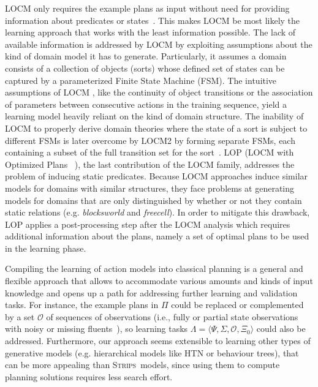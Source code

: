 \documentclass[3p,times]{elsarticle}
\newcommand{\strips}{\textsc{Strips}}     %
\newcommand{\tup}[1]{{\langle #1 \rangle}}
\begin{document}
{\sf LOCM} only requires the example plans as input without need for providing information about predicates or states~\cite{cresswell2013acquiring}. This makes {\sf LOCM} be most likely the learning approach that works with the least information possible. The lack of available information is addressed by LOCM by exploiting assumptions about the kind of domain model it has to generate. Particularly, it assumes a domain consists of a collection of objects (sorts) whose defined set of states can be captured by a parameterized Finite State Machine (FSM). The intuitive assumptions of {\sf LOCM}
, like the continuity of object transitions or the association of parameters between consecutive actions in the training sequence,
yield a learning model heavily reliant on the kind of domain structure. The inability of {\sf LOCM} to properly derive domain theories where the state of a sort is subject to different FSMs is later overcome by {\sf LOCM2} by forming separate FSMs, each containing a subset of the full transition set for the sort~\cite{cresswell2011generalised}. {\sf LOP} ({\sf LOCM} with Optimized Plans ~\cite{gregory2015domain}), the last contribution of the {\sf LOCM} family, addresses the problem of inducing static predicates. Because {\sf LOCM} approaches induce similar models for domains with similar structures, they face problems at generating models for domains that are only distinguished by whether or not they contain static relations (e.g. {\em blocksworld} and {\em freecell}). In order to mitigate this drawback, {\sf LOP} applies a post-processing step after the {\sf LOCM} analysis which requires additional information about the plans, namely a set of optimal plans to be used in the learning phase.

Compiling the learning of action models into classical planning is a general and flexible approach that allows to accommodate various amounts and kinds of input knowledge and opens up a path for addressing further learning and validation tasks. For instance, the example plans in $\Pi$ could be replaced or complemented by a set $\mathcal{O}$ of sequences of observations (i.e., fully or partial state observations with noisy or missing fluents~\cite{SohrabiRU16}), so learning tasks $\Lambda=\tup{\Psi,\Sigma,\mathcal{O},\Xi_0}$ could also be addressed. Furthermore, our approach seems extensible to learning other types of generative models (e.g. hierarchical models like HTN or behaviour trees), that can be more appealing than \strips\ models, since using them to compute planning solutions requires less search effort.
\end{document}
